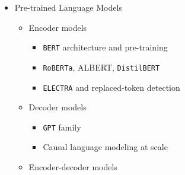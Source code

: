 \documentclass[
]{article}
\providecommand{\tightlist}{%
  \setlength{\itemsep}{0pt}\setlength{\parskip}{0pt}}
\begin{document}
\begin{itemize}
\begin{itemize}
    \begin{itemize}
    \tightlist
    \item
      Encoder block and decoder block
    \item
      Positional encoding (sinusoidal, learned, rotary)
    \item
      Layer normalization placement
    \item
      Residual connections
    \end{itemize}
  \item
    Pre-training objectives

    \begin{itemize}
    \tightlist
    \item
      Masked language modeling (\texttt{BERT})
    \item
      Causal language modeling (\texttt{GPT})
    \item
      Span corruption (\texttt{T5})
    \item
      Denoising and contrastive objectives
    \end{itemize}
  \item
    Scaling laws

    \begin{itemize}
    \tightlist
    \item
      Compute, data, parameter trade-offs
    \item
      Emergent capabilities
    \end{itemize}
  \end{itemize}
\item
  Pre-trained Language Models

  \begin{itemize}
  \tightlist
  \item
    Encoder models

    \begin{itemize}
    \tightlist
    \item
      \texttt{BERT} architecture and pre-training
    \item
      \texttt{RoBERTa}, ALBERT, \texttt{DistilBERT}
    \item
      \texttt{ELECTRA} and replaced-token detection
    \end{itemize}
  \item
    Decoder models

    \begin{itemize}
    \tightlist
    \item
      \texttt{GPT} family
    \item
      Causal language modeling at scale
    \end{itemize}
  \item
    Encoder-decoder models


\end{itemize}
\end{itemize}
\end{document}
